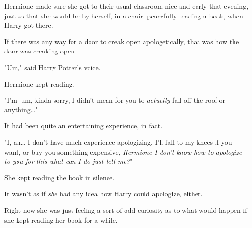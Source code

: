 Hermione made sure she got to their usual classroom nice and early that 
evening, just so that she would be by herself, in a chair, peacefully reading a 
book, when Harry got there.

If there was any way for a door to creak open apologetically, that was how the 
door was creaking open.

"Um," said Harry Potter's voice.

Hermione kept reading.

"I'm, um, kinda sorry, I didn't mean for you to \emph{actually} fall off the 
roof or anything{\ldots}"

It had been quite an entertaining experience, in fact.

"I, ah{\ldots} I don't have much experience apologizing, I'll fall to my knees 
if you want, or buy you something expensive, \emph{Hermione I don't know how to 
apologize to you for this what can I do just tell me?}"

She kept reading the book in silence.

It wasn't as if \emph{she} had any idea how Harry could apologize, either.

Right now she was just feeling a sort of odd curiosity as to what would happen 
if she kept reading her book for a while.